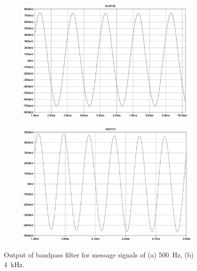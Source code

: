\documentclass[11pt,letter,notitlepage]{article}
\begin{document}
	\begin{figure}[h]
		\centering
		\begin{subfigure}{0.9\linewidth}
			\centering
			\includegraphics[width=\linewidth]{bpf/bpf500hz}
			\caption{}
			\label{fig:bpf500hz}
		\end{subfigure}
		
		\begin{subfigure}{0.9\linewidth}
			\centering
			\includegraphics[width=\linewidth]{bpf/bpf4k}
			\caption{}
			\label{fig:bpf4k}
		\end{subfigure}
		
		\caption{Output of bandpass filter for message signals of (a) \SI{500}{\Hz}, (b) \SI{4}{\kHz}.}
		\label{fig:bpfout}
	\end{figure}

	\clearpage %
\end{document}
